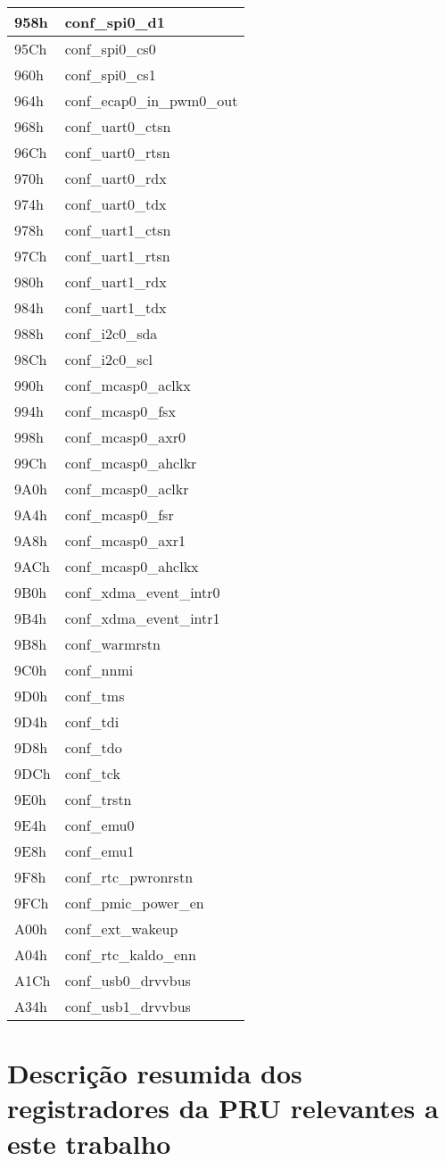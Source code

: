 \begin{longtable}{ | M{7.5cm} | M{7.5cm} |}
	958h & conf\_spi0\_d1 \\ \hline
	95Ch & conf\_spi0\_cs0 \\ \hline
	960h & conf\_spi0\_cs1 \\ \hline
	964h & conf\_ecap0\_in\_pwm0\_out \\ \hline
	968h & conf\_uart0\_ctsn \\ \hline
	96Ch & conf\_uart0\_rtsn \\ \hline
	970h & conf\_uart0\_rdx \\ \hline
	974h & conf\_uart0\_tdx \\ \hline
	978h & conf\_uart1\_ctsn \\ \hline
	97Ch & conf\_uart1\_rtsn \\ \hline
	980h & conf\_uart1\_rdx \\ \hline
	984h & conf\_uart1\_tdx \\ \hline
	988h & conf\_i2c0\_sda \\ \hline
	98Ch & conf\_i2c0\_scl \\ \hline
	990h & conf\_mcasp0\_aclkx \\ \hline
	994h & conf\_mcasp0\_fsx \\ \hline
	998h & conf\_mcasp0\_axr0 \\ \hline
	99Ch & conf\_mcasp0\_ahclkr \\ \hline
	9A0h & conf\_mcasp0\_aclkr \\ \hline
	9A4h & conf\_mcasp0\_fsr \\ \hline
	9A8h & conf\_mcasp0\_axr1 \\ \hline
	9ACh & conf\_mcasp0\_ahclkx \\ \hline
	9B0h & conf\_xdma\_event\_intr0 \\ \hline
	9B4h & conf\_xdma\_event\_intr1 \\ \hline
	9B8h & conf\_warmrstn \\ \hline
	9C0h & conf\_nnmi \\ \hline
	9D0h & conf\_tms \\ \hline
	9D4h & conf\_tdi \\ \hline
	9D8h & conf\_tdo \\ \hline
	9DCh & conf\_tck \\ \hline
	9E0h & conf\_trstn \\ \hline
	9E4h & conf\_emu0 \\ \hline
	9E8h & conf\_emu1 \\ \hline
	9F8h & conf\_rtc\_pwronrstn \\ \hline
	9FCh & conf\_pmic\_power\_en \\ \hline
	A00h & conf\_ext\_wakeup \\ \hline
	A04h & conf\_rtc\_kaldo\_enn \\ \hline
	A1Ch & conf\_usb0\_drvvbus \\ \hline
	A34h & conf\_usb1\_drvvbus \\ \hline
\end{longtable}


\chapter{Descri\c{c}\~ao resumida dos registradores da PRU relevantes a este trabalho}
\label{Anexo3}






